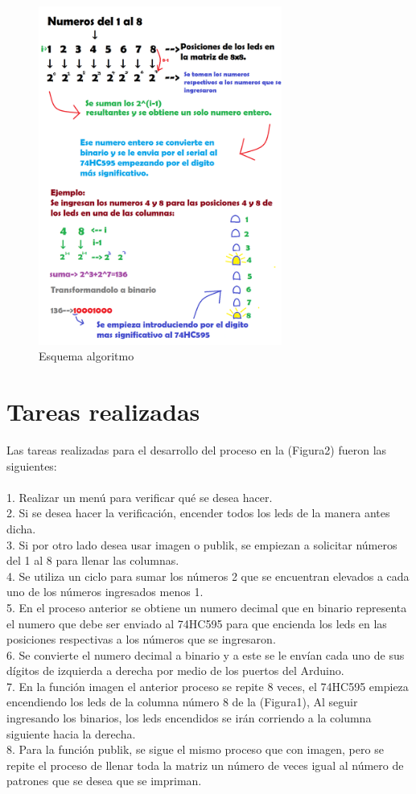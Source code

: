 \documentclass{article}
\begin{document}
\begin{figure}[h]
\includegraphics[width=8cm]{Figura2.png}
\centering
\caption{Esquema algoritmo}
\label{fig:Esquema}
\end{figure}

\section{Tareas realizadas} \label{tareas}
Las tareas realizadas para el desarrollo del proceso en la (Figura2) fueron las siguientes:\\\\
1. Realizar un menú para verificar qué se desea hacer.\\
2. Si se desea hacer la verificación, encender todos los leds de la manera antes dicha.\\
3. Si por otro lado desea usar imagen o publik, se empiezan a solicitar números del 1 al 8 para llenar las columnas.\\ 
4. Se utiliza un ciclo para sumar los números 2 que se encuentran elevados a cada uno de los números ingresados menos 1.\\
5. En el proceso anterior se obtiene un numero decimal que en binario representa el numero que debe ser enviado al 74HC595 para que encienda los leds en las posiciones respectivas a los números que se ingresaron.\\
6. Se convierte el numero decimal a binario y a este se le envían cada uno de sus dígitos de izquierda a derecha por medio de los puertos del Arduino.\\
7. En la función imagen el anterior proceso se repite 8 veces, el 74HC595 empieza encendiendo los leds de la columna número 8 de la (Figura1), Al seguir ingresando los binarios, los leds encendidos se irán corriendo a la columna siguiente hacia la derecha.\\
8. Para la función publik, se sigue el mismo proceso que con imagen, pero se repite el proceso de llenar toda la matriz un número de veces igual al número de patrones que se desea que se impriman.\\\\
\end{document}
